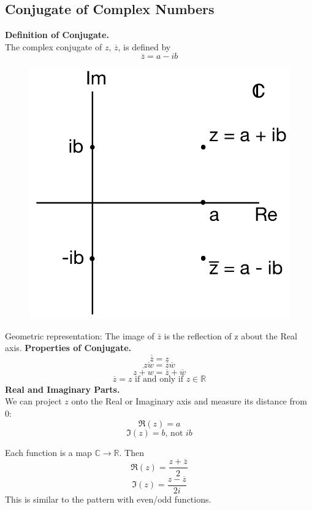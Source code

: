 \documentclass[11pt]{article}
\begin{document}
\subsection{Conjugate of Complex Numbers} 
\newcommand*\conj[1]{\overline{#1}}
\textbf{Definition of Conjugate.} \\
The complex conjugate of $z$, $\conj{z}$, is defined by 
$$\conj{z} = a - ib$$ 
\begin{figure}[H]
\includegraphics[scale = 0.19]{1_2}
\centering
\end{figure}
Geometric representation: The image of $\bar z$ is the reflection of z about the Real axis. 
\newpage
\textbf{Properties of Conjugate.} \\
$$\conj{\conj{z}} = z$$
$$\conj{zw} = \conj{z}\conj{w}$$
$$\conj{z + w} = \conj{z} + \conj{w}$$
\begin{equation*}
\overline{z} = z \mbox{ if and only if } z \in \mathbb{R}
\end{equation*}
\textbf{Real and Imaginary Parts.} \\
\noindent We can project $z$ onto the Real or Imaginary axis and measure its distance from 0: 
$$\Re(z) = a$$
\begin{equation*}
\Im(z) = b \mbox{, not } ib
\end{equation*}

Each function is a map $\mathbb{C} \to \mathbb{R}$. Then 
$$\Re(z) = \frac{z + \conj{z}}{2}$$
$$\Im(z) = \frac{z - \conj{z}}{2i}$$
This is similar to the pattern with even/odd functions. 
\end{document}
